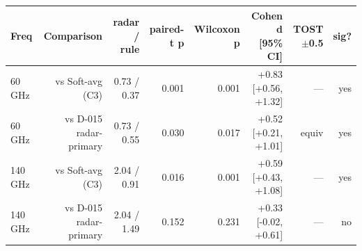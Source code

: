 \begin{tabular}{lrrrrrrr}
\toprule
Freq & Comparison & radar / rule & paired-t p & Wilcoxon p & Cohen d [95\% CI] & TOST$\pm$0.5 & sig? \\
\midrule
60 GHz & vs Soft-avg (C3) & 0.73 / 0.37 & 0.001 & 0.001 & +0.83 [+0.56, +1.32] & --- & yes \\
60 GHz & vs D-015 radar-primary & 0.73 / 0.55 & 0.030 & 0.017 & +0.52 [+0.21, +1.01] & equiv & yes \\
140 GHz & vs Soft-avg (C3) & 2.04 / 0.91 & 0.016 & 0.001 & +0.59 [+0.43, +1.08] & --- & yes \\
140 GHz & vs D-015 radar-primary & 2.04 / 1.49 & 0.152 & 0.231 & +0.33 [-0.02, +0.61] & --- & no \\
\bottomrule
\end{tabular}
